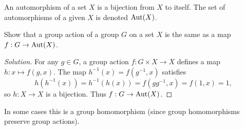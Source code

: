 \begin{defn}
An automorphism of a set $X$ is a bijection from $X$ to itself. The set of automorphisms of a given $X$ is denoted $\operatorname{Aut}(X)$.
\end{defn}
\begin{ex}
Show that a group action of a group $G$ on a set $X$ is the same as a map $f:G\to\operatorname{Aut} (X)$.
\end{ex}
\begin{proof}[Solution]
For any $g\in G$, a group action $f:G\times X \to X$ defines a map $h: x\mapsto f(g,x)$. The map $h^{-1}(x) = f(g^{-1},x)$ satisfies
\[h(h^{-1}(x)) = h^{-1}(h(x)) = f(gg^{-1},x) = f(1,x) = 1,\]
so $h: X\to X$ is a bijection. Thus $f:G\to\operatorname{Aut}(X)$.
\end{proof}
In some cases this is a group homomorphism (since group homomorphisms preserve group actions).

